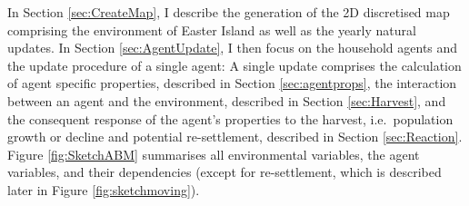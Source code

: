 
In Section \ref{sec:CreateMap}, I describe the generation of the 2D discretised map comprising the environment of Easter Island as well as the yearly natural updates. In Section \ref{sec:AgentUpdate}, I then focus on the household agents and the update procedure of a single agent:
A single update comprises the calculation of agent specific properties, described in Section \ref{sec:agentprops}, the interaction between an agent and the environment, described in Section \ref{sec:Harvest}, and the consequent response of the agent's properties to the harvest, i.e.\ population growth or decline and potential re-settlement, described in Section \ref{sec:Reaction}.
Figure \ref{fig:SketchABM} summarises all environmental variables, the agent variables, and their dependencies (except for re-settlement, which is described later in Figure \ref{fig:sketchmoving}).

